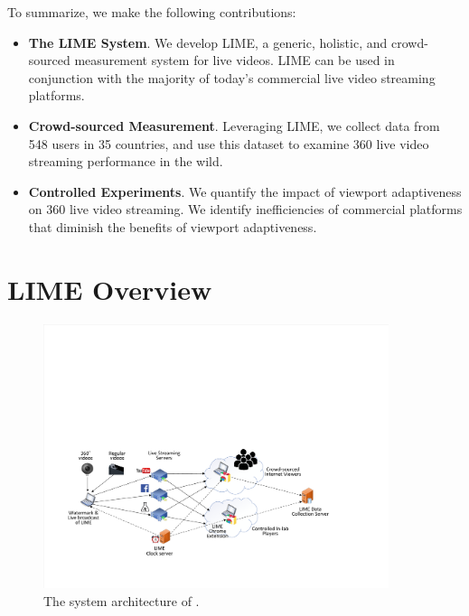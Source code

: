 To summarize, we make the following contributions:
\begin{itemize}
	\item \textbf{The LIME System}. We develop LIME, a generic, holistic,
	and crowd-sourced measurement system for live videos.
	LIME can be used in conjunction with the majority of today’s
	commercial live video streaming platforms.
	\item \textbf{Crowd-sourced Measurement}. Leveraging LIME,
	we collect data from 548 users in 35 countries, and use this
	dataset to examine 360\degree{} live video streaming performance in
	the wild.
	\item \textbf{Controlled Experiments}. We quantify the impact of
	viewport adaptiveness on 360\degree{} live video streaming. We identify
	inefficiencies of commercial platforms that diminish the
	benefits of viewport adaptiveness.
\end{itemize}



\section{LIME Overview}

\begin{figure}
	\footnotesize
	\begin{center}
		\includegraphics[width=0.9\textwidth]{figs/lime/testbed3.pdf}
	\end{center}
	\caption{The system architecture of \lime.}
	\label{fig:testbed}
\end{figure}


